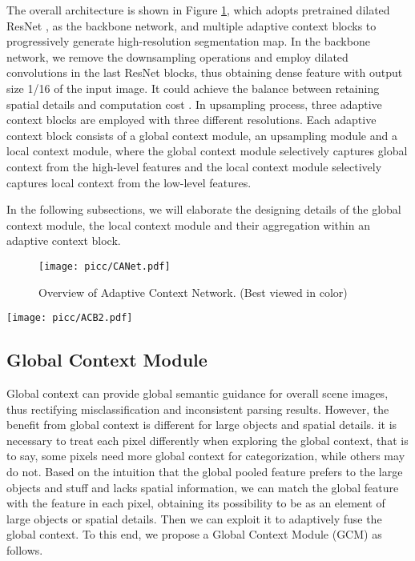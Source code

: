 \documentclass[10pt,twocolumn,letterpaper]{article}
\begin{document}
The overall architecture is shown in Figure \ref{CAN}, which adopts pretrained dilated ResNet \cite{he2016deep}, as the backbone network, and  multiple adaptive context blocks to progressively generate high-resolution segmentation map.
In the backbone network, we  remove the  downsampling operations and employ dilated convolutions in the last ResNet blocks, thus obtaining  dense feature  with output size 1/16 of the input image. It could achieve the balance between retaining spatial details and  computation cost \cite{chen2018encoder}. 
In upsampling process, three adaptive context blocks are employed with three different resolutions.
Each adaptive context block consists of a global context module, an upsampling module and a  local context module, where the global context module selectively  captures global context from the high-level features and the local context module selectively  captures local context from the  low-level features.

In the following subsections, we will elaborate the designing details of the global context module, the local context module and their aggregation within an adaptive context block.

\begin{figure}[!t]
        \centering
        \texttt{[image: picc/CANet.pdf]}
        \vspace{-1em}
        \caption{Overview of Adaptive Context Network. (Best viewed in color)}
         \label{CAN}\vspace{-0.5em}
\end{figure}

\begin{figure*}[!t]
        \centering
        \texttt{[image: picc/ACB2.pdf]}
        \caption{The details of Adaptive Context Block including (1) Global Context Module and (2)  Local Context Module. (Best viewed in color)}
         \label{ACB}\vspace{-1em}
\end{figure*}


\subsection{Global Context Module}
Global context can provide global semantic guidance for overall scene images, thus rectifying misclassification and inconsistent parsing results. However, the benefit from global context is different for large objects and spatial details. 
it is necessary to treat each pixel differently when exploring the global context, that is to say, some pixels need more global context for  categorization, while others may do not.
Based on the intuition that the global pooled feature prefers to the large objects and stuff and lacks spatial information, we can match the global feature with the feature in each pixel,  obtaining its possibility to be as an element of large objects or spatial details.   
Then we can exploit it to adaptively fuse the global context.
To this end, we propose a Global Context Module (GCM) as follows.
\end{document}
